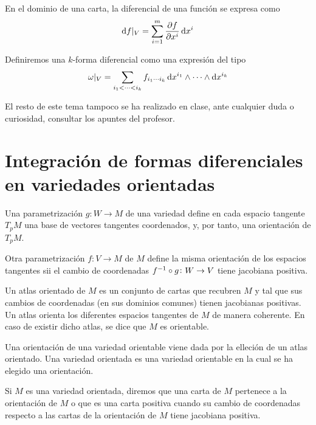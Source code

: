 \begin{prop}
    En el dominio de una carta, la diferencial de una función se expresa como
    \[
        \dif f \vert_V = \sum^m_{i= 1} \frac{\partial f}{\partial x^i} \dif x^i
    \]
\end{prop}

\begin{defi}
    Definiremos una $k$-forma diferencial como una expresión del tipo
    \[
        \omega\vert_V = \sum_{i_1 < \cdots < i_k} f_{i_1 \cdots i_k} \dif x^{i_1} \wedge \cdots \wedge \dif x^{i_k}
    \]
\end{defi}

El resto de este tema tampoco se ha realizado en clase, ante cualquier duda o curiosidad, consultar los apuntes del profesor.

\section{Integración de formas diferenciales en variedades orientadas}

\begin{defi}
    Una parametrización $g \colon W \to M$ de una variedad define en cada espacio tangente $T_pM$ una base de vectores tangentes
    coordenados, y, por tanto, una orientación de $T_pM$.

    Otra parametrización $f \colon V \to M$ de $M$ define la misma orientación de los espacios tangentes sii el cambio de coordenadas
    $f^{-1} \circ g \colon W \to V$ tiene jacobiana positiva.
\end{defi}

\begin{defi}
    Un atlas orientado de $M$ es un conjunto de cartas que recubren $M$ y tal que sus cambios de coordenadas (en sus dominios comunes)
    tienen jacobianas positivas. Un atlas orienta los diferentes espacios tangentes de $M$ de manera coherente. En caso de existir dicho atlas,
    se dice que $M$ es orientable.
\end{defi}

\begin{defi}
    Una orientación de una variedad orientable viene dada por la elleción de un atlas orientado. Una variedad orientada es una variedad
    orientable en la cual se ha elegido una orientación.
\end{defi}

\begin{defi}
    Si $M$ es una variedad orientada, diremos que una carta de $M$ pertenece a la orientación de $M$ o que es una carta positiva cuando su
    cambio de coordenadas respecto a las cartas de la orientación de $M$ tiene jacobiana positiva.
\end{defi}

